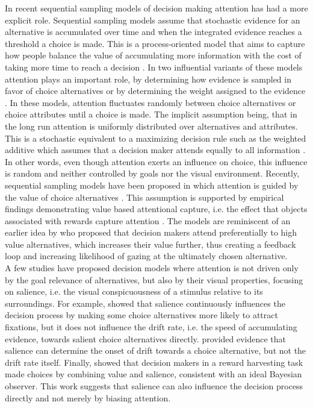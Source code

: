 \documentclass[english,natbib,man,floatsintext]{apa6}
\begin{document}
In recent sequential sampling models of decision making attention has had a more explicit role. Sequential sampling models assume that stochastic evidence for an alternative is accumulated over time and when the integrated evidence reaches a threshold a choice is made. This is a process-oriented model that aims to capture how people balance the value of accumulating more information with the cost of taking more time to reach a decision \citep{forstmann2016}. In two influential variants of these models attention plays an important role, by determining how evidence is sampled in favor of choice alternatives \citep{busemeyer1992} or by determining the weight assigned to the evidence \citep{krajbich2010a, thomas2019}. In these models, attention fluctuates randomly between choice alternatives or choice attributes until a choice is made. The implicit assumption being, that in the long run attention is uniformly distributed over alternatives and attributes. This is a stochastic equivalent to a maximizing decision rule such as the weighted additive which assumes that a decision maker attends equally to all information \cite{gloeckner2011a, payne1988}. In other words, even though attention exerts an influence on choice, this influence is random and neither controlled by goals nor the visual environment. Recently, sequential sampling models have been proposed in which attention is guided by the value of choice alternatives \citep{callaway2019a, gluth2018, gluth2020}. This assumption is supported by empirical findings demonstrating value based attentional capture, i.e. the effect that objects associated with rewards capture attention \citep{lepelley2015}. The models are reminiscent of an earlier idea by \cite{shimojo2003a} who proposed that decision makers attend preferentially to high value alternatives, which increases their value further, thus creating a feedback loop and increasing likelihood of gazing at the ultimately chosen alternative.\\ 

A few studies have proposed decision models where attention is not driven only by the goal relevance of alternatives, but also by their visual properties, focusing on salience, i.e. the visual conspicuousness of a stimulus relative to its surroundings. For example, \cite{towal2013a} showed that salience continuously influences the decision process by making some choice alternatives more likely to attract fixations, but it does not influence the drift rate, i.e. the speed of accumulating evidence, towards salient choice alternatives directly. \cite{chen2013} provided evidence that salience can determine the onset of drift towards a choice alternative, but not the drift rate itself. Finally, \cite{navalpakkam2010} showed that decision makers in a reward harvesting task made choices by combining value and salience, consistent with an ideal Bayesian observer. This work suggests that salience can also influence the decision process directly and not merely by biasing attention.\\ 
\end{document}
